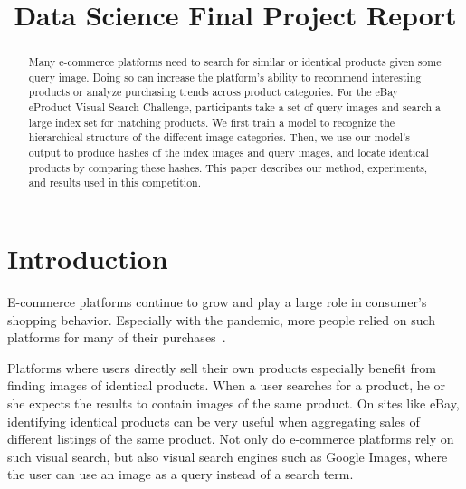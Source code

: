 \documentclass[conference]{IEEEtran}
\begin{document}
\title{Data Science Final Project Report}
\author{
}

\maketitle
\begin{abstract}
	Many e-commerce platforms need to search for similar or identical products
	given some query image.
	Doing so can increase the platform's ability to recommend interesting 
	products or analyze purchasing trends across product categories.
	For the eBay eProduct Visual Search Challenge, participants take a set
	of query images and search a large index set for matching products.
	We first train a model to recognize the hierarchical structure of the different
	image categories.
	Then, we use our model's output to produce hashes of the index images
	and query images, and locate identical products by comparing these hashes.
	This paper describes our method, experiments, and results used in this
	competition.
\end{abstract}

\section{Introduction}
E-commerce platforms continue to grow and play a large role in consumer's
shopping behavior.
Especially with the pandemic, more people relied on such platforms for 
many of their purchases~\cite{jilkova2021digital}.

Platforms where users directly sell their own products especially
benefit from finding images of identical products.
When a user searches for a product, he or she expects the results to contain
images of the same product.
On sites like eBay, identifying identical products can be very useful when 
aggregating sales of different listings of the same product.
Not only do e-commerce platforms rely on such visual search, but also visual
search engines such as Google Images, where the user can use an image as a query
instead of a search term.
\end{document}
